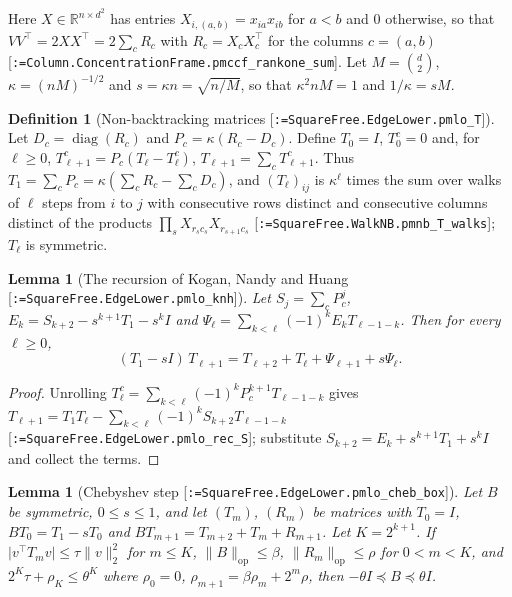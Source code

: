 \documentclass[11pt]{article}
\makeatletter
\newcommand{\formal@break}[1]{\@tfor\formal@tok:=#1\do{%
  \formal@tok
  \expandafter\ifx\formal@tok.\allowbreak\else
  \expandafter\ifx\formal@tok\_\allowbreak\fi\fi}}
\DeclareRobustCommand{\formal}[1]{\textnormal{[\texttt{\small\formal@break{#1}}]}}
\newcommand{\R}{\mathbb{R}}
\newcommand{\norm}[1]{\lVert #1\rVert}
\newcommand{\abs}[1]{\lvert #1\rvert}
\newcommand{\op}{\mathrm{op}}
\newcommand{\Id}{I}
\newcommand{\diag}{\operatorname{diag}}
\theoremstyle{plain}
\newtheorem{lemma}[theorem]{Lemma}
\theoremstyle{definition}
\newtheorem{definition}[theorem]{Definition}
\makeatother
\begin{document}
Here $X \in \R^{n\times d^2}$ has entries $X_{i,(a,b)} = x_{ia}x_{ib}$ for
$a < b$ and $0$ otherwise, so that $VV^{\top} = 2XX^{\top} = 2\sum_c R_c$ with
$R_c = X_cX_c^{\top}$ for the columns $c = (a, b)$
\formal{Column.ConcentrationFrame.pmccf\_rankone\_sum}. Let
$M = \binom d2$, $\kappa = (nM)^{-1/2}$ and $s = \kappa n = \sqrt{n/M}$, so
that $\kappa^2nM = 1$ and $1/\kappa = sM$.

\begin{definition}[Non-backtracking matrices \formal{SquareFree.EdgeLower.pmlo\_T}]
Let $D_c = \diag(R_c)$ and $P_c = \kappa(R_c - D_c)$. Define $T_0 = \Id$,
$T_0^c = 0$ and, for $\ell \ge 0$, $T^c_{\ell+1} = P_c(T_\ell - T^c_\ell)$,
$T_{\ell+1} = \sum_cT^c_{\ell+1}$. Thus $T_1 = \sum_cP_c = \kappa(\sum_cR_c - \sum_cD_c)$,
and $(T_\ell)_{ij}$ is $\kappa^\ell$ times the sum over walks of $\ell$ steps
from $i$ to $j$ with consecutive rows distinct and consecutive columns
distinct of the products $\prod_sX_{r_sc_s}X_{r_{s+1}c_s}$
\formal{SquareFree.WalkNB.pmnb\_T\_walks}; $T_\ell$ is symmetric.
\end{definition}

\begin{lemma}[The recursion of Kogan, Nandy and Huang \formal{SquareFree.EdgeLower.pmlo\_knh}]\label{lem:knh}
Let $S_j = \sum_cP_c^j$, $E_k = S_{k+2} - s^{k+1}T_1 - s^k\Id$ and
$\Psi_\ell = \sum_{k<\ell}(-1)^kE_kT_{\ell-1-k}$. Then for every $\ell \ge 0$,
\[
(T_1 - s\Id)\,T_{\ell+1} = T_{\ell+2} + T_\ell + \Psi_{\ell+1} + s\Psi_\ell .
\]
\end{lemma}

\begin{proof}
Unrolling $T^c_{\ell} = \sum_{k<\ell}(-1)^kP_c^{k+1}T_{\ell-1-k}$ gives
$T_{\ell+1} = T_1T_\ell - \sum_{k<\ell}(-1)^kS_{k+2}T_{\ell-1-k}$
\formal{SquareFree.EdgeLower.pmlo\_rec\_S}; substitute
$S_{k+2} = E_k + s^{k+1}T_1 + s^k\Id$ and collect the terms.
\end{proof}

\begin{lemma}[Chebyshev step \formal{SquareFree.EdgeLower.pmlo\_cheb\_box}]\label{lem:cheb}
Let $B$ be symmetric, $0 \le s \le 1$, and let $(T_m)$, $(R_m)$ be matrices
with $T_0 = \Id$, $BT_0 = T_1 - sT_0$ and $BT_{m+1} = T_{m+2} + T_m + R_{m+1}$.
Let $K = 2^{k+1}$. If $\abs{v^{\top}T_mv} \le \tau\norm{v}_2^2$ for $m \le K$,
$\norm{B}_\op \le \beta$, $\norm{R_m}_\op \le \rho$ for $0 < m < K$, and
$2^K\tau + \rho_K \le \theta^K$ where $\rho_0 = 0$,
$\rho_{m+1} = \beta\rho_m + 2^m\rho$, then $-\theta\Id \preceq B \preceq \theta\Id$.
\end{lemma}
\end{document}
